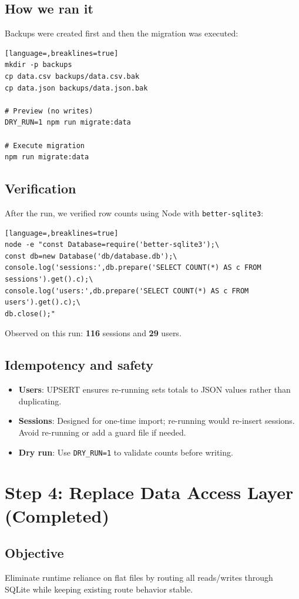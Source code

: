 \documentclass[11pt,a4paper]{article}
\begin{document}
\subsection{How we ran it}
Backups were created first and then the migration was executed:
\begin{lstlisting}[language=,breaklines=true]
mkdir -p backups
cp data.csv backups/data.csv.bak
cp data.json backups/data.json.bak

# Preview (no writes)
DRY_RUN=1 npm run migrate:data

# Execute migration
npm run migrate:data
\end{lstlisting}

\subsection{Verification}
After the run, we verified row counts using Node with \texttt{better-sqlite3}:
\begin{lstlisting}[language=,breaklines=true]
node -e "const Database=require('better-sqlite3');\
const db=new Database('db/database.db');\
console.log('sessions:',db.prepare('SELECT COUNT(*) AS c FROM sessions').get().c);\
console.log('users:',db.prepare('SELECT COUNT(*) AS c FROM users').get().c);\
db.close();"
\end{lstlisting}
Observed on this run: \textbf{116} sessions and \textbf{29} users.

\subsection{Idempotency and safety}
\begin{itemize}[noitemsep]
  \item \textbf{Users}: UPSERT ensures re-running sets totals to JSON values rather than duplicating.
  \item \textbf{Sessions}: Designed for one-time import; re-running would re-insert sessions. Avoid re-running or add a guard file if needed.
  \item \textbf{Dry run}: Use \texttt{DRY\_RUN=1} to validate counts before writing.
\end{itemize}

\section{Step 4: Replace Data Access Layer (Completed)}
\subsection{Objective}
Eliminate runtime reliance on flat files by routing all reads/writes through SQLite while keeping existing route behavior stable.
\end{document}
